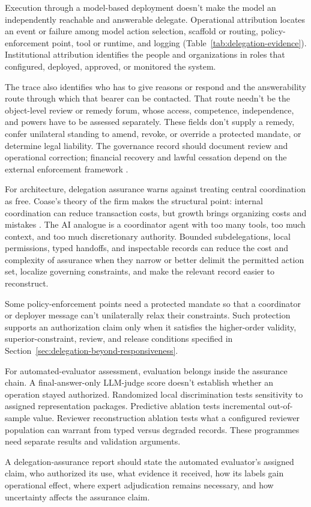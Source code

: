 Execution through a model-based deployment doesn't make the model an independently reachable and answerable delegate. Operational attribution locates an event or failure among model action selection, scaffold or routing, policy-enforcement point, tool or runtime, and logging (Table~\ref{tab:delegation-evidence}). Institutional attribution identifies the people and organizations in roles that configured, deployed, approved, or monitored the system.

The trace also identifies who has to give reasons or respond and the answerability route through which that bearer can be contacted. That route needn't be the object-level review or remedy forum, whose access, competence, independence, and powers have to be assessed separately. These fields don't supply a remedy, confer unilateral standing to amend, revoke, or override a protected mandate, or determine legal liability. The governance record should document review and operational correction; financial recovery and lawful cessation depend on the external enforcement framework \parencite{rajagopalan2026governingAgenticAI}.

For architecture, delegation assurance warns against treating central coordination as free. Coase's theory of the firm makes the structural point: internal coordination can reduce transaction costs, but growth brings organizing costs and mistakes \parencite{coase1937nature}. The AI analogue is a coordinator agent with too many tools, too much context, and too much discretionary authority. Bounded subdelegations, local permissions, typed handoffs, and inspectable records can reduce the cost and complexity of assurance when they narrow or better delimit the permitted action set, localize governing constraints, and make the relevant record easier to reconstruct.

Some policy-enforcement points need a protected mandate so that a coordinator or deployer message can't unilaterally relax their constraints. Such protection supports an authorization claim only when it satisfies the higher-order validity, superior-constraint, review, and release conditions specified in Section~\ref{sec:delegation-beyond-responsiveness}.

For automated-evaluator assessment, evaluation belongs inside the assurance chain. A final-answer-only LLM-judge score doesn't establish whether an operation stayed authorized. Randomized local discrimination tests sensitivity to assigned representation packages. Predictive ablation tests incremental out-of-sample value. Reviewer reconstruction ablation tests what a configured reviewer population can warrant from typed versus degraded records. These programmes need separate results and validation arguments.

A delegation-assurance report should state the automated evaluator's assigned claim, who authorized its use, what evidence it received, how its labels gain operational effect, where expert adjudication remains necessary, and how uncertainty affects the assurance claim.

